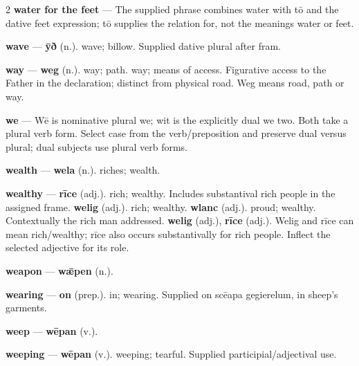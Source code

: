 \begin{multicols}{2}
\textbf{water for the feet} — The supplied phrase combines water with tō and the dative feet expression; tō supplies the relation for, not the meanings water or feet.\par
\textbf{wave} — \textbf{ȳð} (n.). wave; billow. Supplied dative plural after fram.\par
\textbf{way} — \textbf{weg} (n.). way; path. way; means of access. Figurative access to the Father in the declaration; distinct from physical road. Weg means road, path or way.\par
\textbf{we} — Wē is nominative plural we; wit is the explicitly dual we two. Both take a plural verb form. Select case from the verb/preposition and preserve dual versus plural; dual subjects use plural verb forms.\par
\textbf{wealth} — \textbf{wela} (n.). riches; wealth.\par
\textbf{wealthy} — \textbf{rīce} (adj.). rich; wealthy. Includes substantival rich people in the assigned frame. \textbf{welig} (adj.). rich; wealthy. \textbf{wlanc} (adj.). proud; wealthy. Contextually the rich man addressed. \textbf{welig} (adj.), \textbf{rīce} (adj.). Welig and rīce can mean rich/wealthy; rīce also occurs substantivally for rich people. Inflect the selected adjective for its role.\par
\textbf{weapon} — \textbf{wǣpen} (n.).\par
\textbf{wearing} — \textbf{on} (prep.). in; wearing. Supplied on scēapa gegierelum, in sheep's garments.\par
\textbf{weep} — \textbf{wēpan} (v.).\par
\textbf{weeping} — \textbf{wēpan} (v.). weeping; tearful. Supplied participial/adjectival use.\par

\end{multicols}
